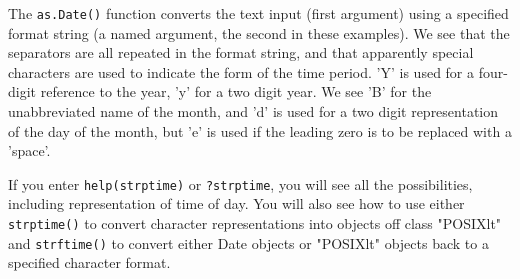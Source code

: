 \documentclass[titlepage]{book}\usepackage{knitr}
\begin{document}
\begin{knitrout}
\color{fgcolor}
\end{knitrout}
  The \texttt{as.Date()} function converts the text input (first argument) using a specified format string (a named argument, the second in these examples). We see that the separators are all repeated in the format string, and that apparently special characters are used to indicate the form of the time period. 'Y' is used for a four-digit reference to the year, 'y' for a two digit year. We see 'B' for the unabbreviated name of the month, and 'd' is used for a two digit representation of the day of the month, but 'e' is used if the leading zero is to be replaced with a 'space'. 

If you enter \texttt{help(strptime)} or \texttt{?strptime}, you will see all the possibilities, including representation of time of day. You will also see how to use either \texttt{strptime()} to convert character representations into objects off class "POSIXlt" and \texttt{strftime()} to convert either Date objects or "POSIXlt" objects back to a specified character format. 
\end{document}
